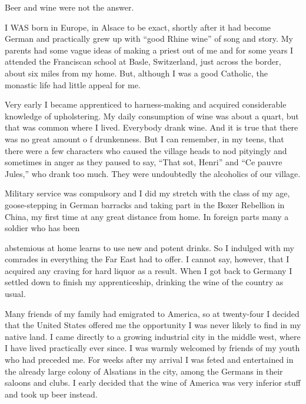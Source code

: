 
\bbChapterPreamble


\begin{biblechapter}
Beer and wine were not the answer.
\end{biblechapter}


\begin{biblechapter}
    I WAS born in Europe, in Alsace to be exact, 
    shortly after it had become German 
    and practically grew up with “good Rhine wine” of song and story.
\verse My parents had some vague ideas of making a priest out of me 
    and for some years I attended the Franciscan school 
    at Basle, Switzerland, 
    just across the border, 
    about six miles from my home.
\verse But, although I was a good Catholic, 
    the monastic life had little appeal for me.

\verse Very early I became apprenticed to harness-making and acquired considerable knowledge of upholstering. My daily consumption of wine was about a quart, but that was common where I lived. Everybody drank wine. And it is true that there was no great amount o f drunkenness. But I can remember, in my teens, that there were a few characters who caused the village heads to nod pityingly and sometimes in anger as they paused to say, “That sot, Henri” and “Ce pauvre Jules,” who drank too much. They were undoubtedly the alcoholics of our village.

Military service was compulsory and I did my stretch with the class of my age, goose-stepping in German barracks and taking part in the Boxer Rebellion in China, my first time at any great distance from home. In foreign parts many a soldier who has been

abstemious at home learns to use new and potent drinks. So I indulged with my comrades in everything the Far East had to offer. I cannot say, however, that I acquired any craving for hard liquor as a result. When I got back to Germany I settled down to finish my apprenticeship, drinking the wine of the country as usual.

Many friends of my family had emigrated to America, so at twenty-four I decided that the United States offered me the opportunity I was never likely to find in my native land. I came directly to a growing industrial city in the middle west, where I have lived practically ever since. I was warmly welcomed by friends of my youth who had preceded me. For weeks after my arrival I was feted and entertained in the already large colony of Alsatians in the city, among the Germans in their saloons and clubs. I early decided that the wine of America was very inferior stuff and took up beer instead.


\end{biblechapter}
